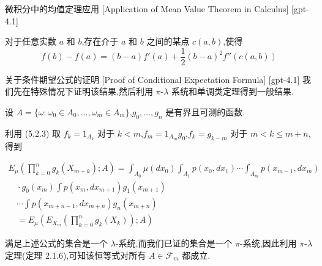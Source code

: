 \documentclass[UTF8]{ctexart}
\begin{document}
    
    
    \begin{ppt}
        {微积分中的均值定理应用}
        [Application of Mean Value Theorem in Calculus]
        [gpt-4.1]
        
对于任意实数 $a$ 和 $b$,存在介于 $a$ 和 $b$ 之间的某点 $c(a, b)$,使得
\[
f(b) - f(a) = (b - a) f'(a) + \frac{1}{2} (b - a)^{2} f''(c(a, b))
\]

    \end{ppt}
    
    
    
    \begin{prf}
        {关于条件期望公式的证明}
        [Proof of Conditional Expectation Formula]
        [gpt-4.1]
        我们先在特殊情况下证明该结果,然后利用 $\pi$-$\lambda$ 系统和单调类定理得到一般结果.

设 $A = \{ \omega : \omega _ { 0 } \in A _ { 0 } , \ldots , \omega _ { m } \in A _ { m } \}$,$g _ { 0 } , \ldots , g _ { n }$ 是有界且可测的函数.

利用 (5.2.3) 取 $f _ { k } = 1 _ { A _ { k } }$ 对于 $k < m$,$f _ { m } = 1 _ { A _ { m } } g _ { 0 }$,$f _ { k } = g _ { k - m }$ 对于 $m < k \leq m + n$,得到

\[
\begin{array}{l}
\displaystyle E _ { \mu } \left( \prod _ { k = 0 } ^ { n } g _ { k } ( X _ { m + k } ) ; A \right) = \int _ { A _ { 0 } } \mu ( d x _ { 0 } ) \int _ { A _ { 1 } } p ( x _ { 0 } , d x _ { 1 } ) \cdots \int _ { A _ { m } } p ( x _ { m - 1 } , d x _ { m } ) \\
\displaystyle \phantom { \frac { A _ { 1 } } { A _ { 1 } } } \cdot g _ { 0 } ( x _ { m } ) \int p ( x _ { m } , d x _ { m + 1 } ) g _ { 1 } ( x _ { m + 1 } ) \\
\displaystyle \phantom { \frac { A _ { 1 } } { A _ { 1 } } } \cdots \int p ( x _ { m + n - 1 } , d x _ { m + n } ) g _ { n } ( x _ { m + n } ) \\
\displaystyle \phantom { \frac { A _ { 1 } } { A _ { 1 } } } = E _ { \mu } \left( E _ { X _ { m } } \left( \prod _ { k = 0 } ^ { n } g _ { k } ( X _ { k } ) \right) ; A \right)
\end{array}
\]

满足上述公式的集合是一个 $\lambda$-系统,而我们已证的集合是一个 $\pi$-系统,因此利用 $\pi$-$\lambda$ 定理(定理 2.1.6),可知该恒等式对所有 $A \in \mathcal{F}_m$ 都成立.
    \end{prf}
    
\end{document}
